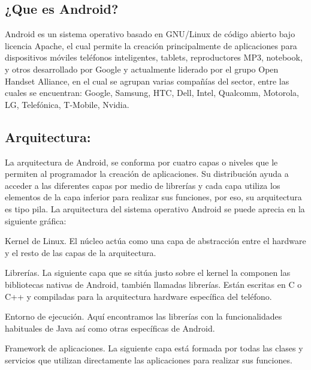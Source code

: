 \documentclass{bmcart}
\begin{document}
\subsection*{¿Que es Android?}

Android es un sistema operativo basado en GNU/Linux de código abierto bajo licencia Apache, el cual permite la creación principalmente de aplicaciones para dispositivos móviles teléfonos inteligentes, tablets, reproductores MP3, notebook, y otros desarrollado por Google  y actualmente liderado por el grupo Open Handset Alliance, en el cual se agrupan varias compañías del sector, entre las cuales se encuentran: Google, Samsung, HTC, Dell, Intel, Qualcomm, Motorola, LG, Telefónica, T-Mobile, Nvidia.\cite{vanegas2014android}\cite{polanco2011android}\cite{baez1997introduccion}\cite{benbourahala2013android}


\subsection*{Arquitectura:}

La arquitectura de Android, se conforma por cuatro capas o niveles que le permiten al programador la creación de aplicaciones. Su distribución ayuda a acceder a las diferentes capas por medio de librerías y cada capa utiliza los elementos de la capa inferior para realizar sus funciones, por eso, su arquitectura es tipo pila. La arquitectura del sistema operativo Android se puede aprecia en la siguiente gráfica:\cite{vanegas2014android}\newline

Kernel de Linux.
El núcleo actúa como una capa de abstracción entre el hardware y el resto de las capas de la arquitectura. 
\newline


Librerías.
La siguiente capa que se sitúa justo sobre el kernel la componen las bibliotecas nativas de Android, también llamadas librerías. Están escritas en C o C++ y compiladas para la arquitectura hardware específica del teléfono.
\newline

Entorno de ejecución.
Aquí encontramos las librerías con la funcionalidades habituales de Java así como otras específicas de Android.
\newline

Framework de aplicaciones.
La siguiente capa está formada por todas las clases y servicios que utilizan directamente las aplicaciones para realizar sus funciones. 
\newline
\end{document}
